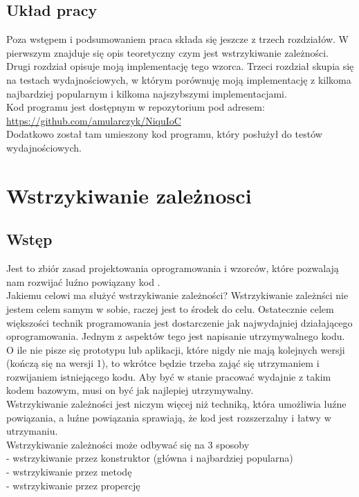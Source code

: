 \documentclass[12pt]{article}
\begin{document}
\subsection{Układ pracy}
Poza wstępem i podsumowaniem praca składa się jeszcze z trzech rozdziałów. W pierwszym znajduje się opis teoretyczny czym jest wstrzykiwanie zależności. Drugi rozdział opisuje moją implementację tego wzorca. Trzeci rozdział skupia się na testach wydajnościowych, w którym porównuję moją implementację z kilkoma najbardziej popularnym i kilkoma najszybszymi implementacjami.\\
Kod programu jest dostępnym w repozytorium pod adresem: \url{https://github.com/amularczyk/NiquIoC}\\
Dodatkowo został tam umieszony kod programu, który posłużył do testów wydajnościowych.



\clearpage

\section{Wstrzykiwanie zależnosci}
\subsection{Wstęp}
Jest to zbiór zasad projektowania oprogramowania i wzorców, które pozwalają nam rozwijać luźno powiązany kod \cite{dependency_injection}.\\
Jakiemu celowi ma służyć wstrzykiwanie zależności? Wstrzykiwanie zależnści nie jestem celem samym w sobie, raczej jest to środek do celu. Ostatecznie celem większości technik programowania jest dostarczenie jak najwydajniej działającego oprogramowania. Jednym z aspektów tego jest napisanie utrzymywalnego kodu.\\
O ile nie pisze się prototypu lub aplikacji, które nigdy nie mają kolejnych wersji (kończą się na wersji 1), to wkrótce będzie trzeba zająć się utrzymaniem i rozwijaniem istniejącego kodu. Aby być w stanie pracować wydajnie z takim kodem bazowym, musi on być jak najlepiej utrzymywalny.\\
Wstrzykiwanie zależności jest niczym więcej niż techniką, która umożliwia luźne powiązania, a luźne powiązania sprawiają, że kod jest rozszerzalny i łatwy w utrzymaniu. \cite{dependency_injection}\\
Wstrzykiwanie zależności może odbywać się na 3 sposoby\\
- wstrzykiwanie przez konstruktor (główna i najbardziej popularna)\\
- wstrzykiwanie przez metodę\\
- wstrzykiwanie przez propercję\\
\end{document}
